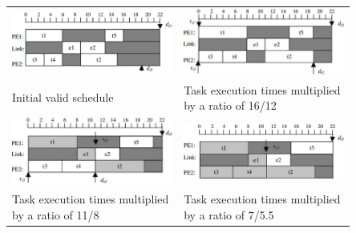 		\begin{longtable}{p{0.425\linewidth}p{0.425\linewidth}}
			\includegraphics[scale=0.26]{./pictures/voltage_scheduling_1.png}
			& \includegraphics[scale=0.35]{./pictures/voltage_scheduling_2.png}\\
			Initial valid schedule & Task execution times multiplied by a ratio of 16/12 \\
			\includegraphics[scale=0.35]{./pictures/voltage_scheduling_3.png}
			& \includegraphics[scale=0.3]{./pictures/voltage_scheduling_4.png}\\
			Task execution times multiplied by a ratio of 11/8 & Task execution times multiplied by a ratio of 7/5.5 \\
		\end{longtable}